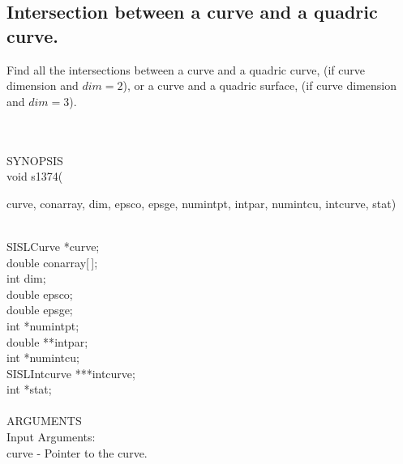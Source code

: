 \subsection{Intersection between a curve and a quadric curve.}
\begin{minipg1}
  Find all the intersections between a curve and a quadric
  curve, (if curve dimension and $dim=2$), or a curve and a
  quadric surface, (if curve dimension and $dim=3$).
\end{minipg1} \\ \\
SYNOPSIS\\
        \>void s1374(\begin{minipg3}
        {\fov curve}, {\fov conarray}, {\fov dim}, {\fov epsco}, {\fov epsge}, {\fov numintpt}, {\fov intpar},
                        {\fov numintcu}, {\fov intcurve}, {\fov stat})
                \end{minipg3}\\[0.3ex]
                \>\>    SISLCurve       \>      *{\fov curve};\\
                \>\>    double  \>      {\fov conarray}[\,];\\
                \>\>    int     \>      {\fov dim};\\
                \>\>    double  \>      {\fov epsco};\\
                \>\>    double  \>      {\fov epsge};\\
                \>\>    int     \>      *{\fov numintpt};\\
                \>\>    double  \>      **{\fov intpar};\\
                \>\>    int     \>      *{\fov numintcu};\\
                \>\>    SISLIntcurve \> ***{\fov intcurve};\\
                \>\>    int     \>      *{\fov stat};\\
\\
ARGUMENTS\\
        \>Input Arguments:\\
        \>\>    {\fov curve}    \> - \> Pointer to the curve.\\
